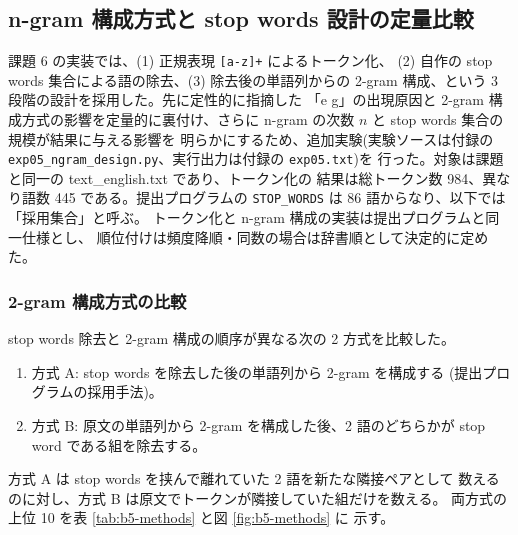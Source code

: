 \subsection{n-gram 構成方式と stop words 設計の定量比較}

課題 6 の実装では、(1) 正規表現 {\tt [a-z]+} によるトークン化、
(2) 自作の stop words 集合による語の除去、(3) 除去後の単語列からの
2-gram 構成、という 3 段階の設計を採用した。先に定性的に指摘した
「e g」の出現原因と 2-gram 構成方式の影響を定量的に裏付け、さらに
n-gram の次数 $n$ と stop words 集合の規模が結果に与える影響を
明らかにするため、追加実験(実験ソースは付録の
{\tt exp05\_ngram\_design.py}、実行出力は付録の {\tt exp05.txt})を
行った。対象は課題と同一の text\_english.txt であり、トークン化の
結果は総トークン数 984、異なり語数 445 である。提出プログラムの
{\tt STOP\_WORDS} は 86 語からなり、以下では「採用集合」と呼ぶ。
トークン化と n-gram 構成の実装は提出プログラムと同一仕様とし、
順位付けは頻度降順・同数の場合は辞書順として決定的に定めた。

\subsubsection{2-gram 構成方式の比較}

stop words 除去と 2-gram 構成の順序が異なる次の 2 方式を比較した。

\begin{enumerate}
\item 方式 A: stop words を除去した後の単語列から 2-gram を構成する
      (提出プログラムの採用手法)。
\item 方式 B: 原文の単語列から 2-gram を構成した後、2 語のどちらかが
      stop word である組を除去する。
\end{enumerate}

方式 A は stop words を挟んで離れていた 2 語を新たな隣接ペアとして
数えるのに対し、方式 B は原文でトークンが隣接していた組だけを数える。
両方式の上位 10 を表 \ref{tab:b5-methods} と図 \ref{fig:b5-methods} に
示す。

